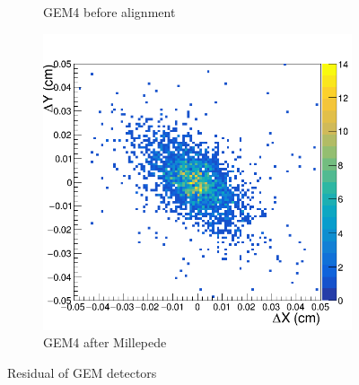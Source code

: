 \begin{figure}[h!]
\begin{subfigure}[l]{.45\textwidth}
   \caption{GEM4 before alignment}
   \label{fig:GEM4_before}
 \end{subfigure}
 \begin{subfigure}[r]{.45\textwidth}
   \centering
   \includegraphics[width=\linewidth]{thesis_figures/alignment/Run_3211_after_millepede/square/GEM4.png}
   \caption{GEM4 after Millepede}
   \label{fig:GEM4_after}
 \end{subfigure}
 \caption{Residual of GEM detectors}
 \label{fig:GEM_residuals}
\end{figure}


